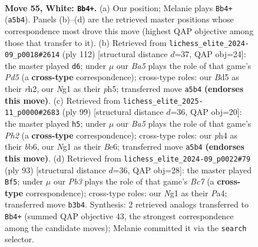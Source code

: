 \documentclass[11pt]{article}
\begin{document}
\clearpage

\begin{figure}[p]\centering
\begin{subfigure}{0.46\textwidth}\centering
\resizebox{\linewidth}{!}{%
\newchessgame
\chessboard[
  setfen={8/4k3/7r/B2B4/P5bp/1PK2p2/5R2/6N1 w - - 4 55},
  showmover=false,
  pgfstyle=straightmove, color=movearrow, markmove={a5-b4}
]}
\caption{}
\end{subfigure}\hfill
\begin{subfigure}{0.46\textwidth}\centering
\resizebox{\linewidth}{!}{%
\newchessgame
\chessboard[
  setfen={3k4/1p6/8/2PPK2p/4B2P/8/p6r/R7 w - - 1 57},
  showmover=false,
  pgfstyle=straightmove, color=movearrow, markmove={d5-d6}
]}
\caption{}
\end{subfigure}
\\[4pt]
\begin{subfigure}{0.46\textwidth}\centering
\resizebox{\linewidth}{!}{%
\newchessgame
\chessboard[
  setfen={8/7p/1B2b1k1/8/PR6/r6p/5P1K/8 b - - 5 50},
  showmover=false,
  pgfstyle=straightmove, color=movearrow, markmove={h7-h5}
]}
\caption{}
\end{subfigure}\hfill
\begin{subfigure}{0.46\textwidth}\centering
\resizebox{\linewidth}{!}{%
\newchessgame
\chessboard[
  setfen={8/4B1R1/2k3p1/8/p2K4/P6P/r1b5/8 b - - 9 47},
  showmover=false,
  pgfstyle=straightmove, color=movearrow, markmove={c2-f5}
]}
\caption{}
\end{subfigure}
\caption{\textbf{Move 55, White: \texttt{Bb4+}.} (a) Our position; Melanie plays \texttt{Bb4+} (\texttt{a5b4}). Panels (b)--(d) are the retrieved master positions whose correspondence most drove this move (highest QAP objective among those that transfer to it). (b) Retrieved from \texttt{lichess\_elite\_2024-09\_p0018\#2614} (ply 112) [structural distance $d$=37, QAP obj=24]: the master played \texttt{d6}; under $\mu$ our \emph{Ba5} plays the role of that game's \emph{Pd5} (a \textbf{cross-type} correspondence); cross-type roles: our \emph{B}d5 as their \emph{r}h2, our \emph{N}g1 as their \emph{p}h5; transferred move \texttt{a5b4} \textbf{(endorses this move)}. (c) Retrieved from \texttt{lichess\_elite\_2025-11\_p0000\#2683} (ply 99) [structural distance $d$=36, QAP obj=20]: the master played \texttt{h5}; under $\mu$ our \emph{Ba5} plays the role of that game's \emph{Ph2} (a \textbf{cross-type} correspondence); cross-type roles: our \emph{p}h4 as their \emph{b}b6, our \emph{N}g1 as their \emph{B}e6; transferred move \texttt{a5b4} \textbf{(endorses this move)}. (d) Retrieved from \texttt{lichess\_elite\_2024-09\_p0022\#79} (ply 93) [structural distance $d$=36, QAP obj=28]: the master played \texttt{Bf5}; under $\mu$ our \emph{Pb3} plays the role of that game's \emph{Bc7} (a \textbf{cross-type} correspondence); cross-type roles: our \emph{N}g1 as their \emph{P}a4; transferred move \texttt{b3b4}. Synthesis: 2 retrieved analogs transferred to \texttt{Bb4+} (summed QAP objective 43, the strongest correspondence among the candidate moves); Melanie committed it via the \texttt{search} selector.}
\label{fig:thought-m108}
\end{figure}
\end{document}

